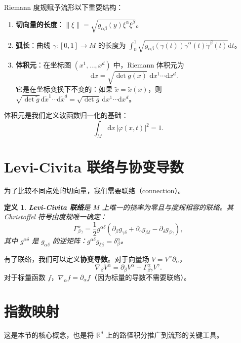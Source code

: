 \documentclass{book}
\newcommand{\mathd}{\mathrm{d}}
\newtheorem{definition}{定义}[chapter]
\begin{document}
Riemann 度规赋予流形以下重要结构：

\begin{enumerate}
  \item \textbf{切向量的长度}：$\|\xi\| = \sqrt{g_{\alpha\beta}(y) \xi^\alpha \xi^\beta}$。
  \item \textbf{弧长}：曲线 $\gamma: [0,1] \to M$ 的长度为 $\int_0^1 \sqrt{g_{\alpha\beta}(\gamma(t)) \dot{\gamma}^\alpha(t) \dot{\gamma}^\beta(t)} \mathd t$。
  \item \textbf{体积元}：在坐标图 $(x^1,\ldots,x^d)$ 中，Riemann 体积元为
    \[
    \mathd x = \sqrt{\det g(x)} \; \mathd x^1 \cdots \mathd x^d.
    \]
    它是在坐标变换下不变的：如果 $\tilde x = \tilde x(x)$，则 $\sqrt{\det \tilde g} \, \mathd \tilde x^1 \cdots \mathd \tilde x^d = \sqrt{\det g} \, \mathd x^1 \cdots \mathd x^d$。
\end{enumerate}

体积元是我们定义波函数归一化的基础：
\[
\int_M \mathd x \, |\varphi(x,t)|^2 = 1.
\]

\section{Levi-Civita 联络与协变导数}

为了比较不同点处的切向量，我们需要联络（connection）。

\begin{definition}
  \textbf{Levi-Civita 联络}是 $M$ 上唯一的挠率为零且与度规相容的联络。其 Christoffel 符号由度规唯一确定：
  \[
  \Gamma^\alpha_{\beta\gamma} = \frac{1}{2} g^{\alpha\delta} \left( \partial_\beta g_{\gamma\delta} + \partial_\gamma g_{\beta\delta} - \partial_\delta g_{\beta\gamma} \right),
  \]
  其中 $g^{\alpha\delta}$ 是 $g_{\alpha\delta}$ 的逆矩阵：$g^{\alpha\delta} g_{\delta\beta} = \delta^\alpha_\beta$。
\end{definition}

有了联络，我们可以定义\textbf{协变导数}。对于向量场 $V = V^\alpha \partial_\alpha$，
\[
\nabla_\beta V^\alpha = \partial_\beta V^\alpha + \Gamma^\alpha_{\beta\gamma} V^\gamma.
\]
对于标量函数 $f$，$\nabla_\alpha f = \partial_\alpha f$（因为标量的导数不需要联络）。

\section{指数映射}

这是本节的核心概念，也是将 $\mathbb{R}^d$ 上的路径积分推广到流形的关键工具。
\end{document}
